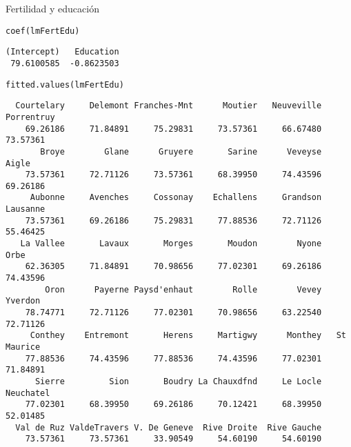 \documentclass[xcolor={usenames,svgnames,dvipsnames}]{beamer}
\begin{document}
\begin{frame}[fragile,label={sec:orga1748bf}]{Fertilidad y educación}
 \lstset{language=r,label= ,caption= ,captionpos=b,numbers=none}
\begin{lstlisting}
coef(lmFertEdu)
\end{lstlisting}

\begin{verbatim}
(Intercept)   Education 
 79.6100585  -0.8623503
\end{verbatim}

\lstset{language=r,label= ,caption= ,captionpos=b,numbers=none}
\begin{lstlisting}
fitted.values(lmFertEdu)
\end{lstlisting}

\begin{verbatim}
  Courtelary     Delemont Franches-Mnt      Moutier   Neuveville   Porrentruy 
    69.26186     71.84891     75.29831     73.57361     66.67480     73.57361 
       Broye        Glane      Gruyere       Sarine      Veveyse        Aigle 
    73.57361     72.71126     73.57361     68.39950     74.43596     69.26186 
     Aubonne     Avenches     Cossonay    Echallens     Grandson     Lausanne 
    73.57361     69.26186     75.29831     77.88536     72.71126     55.46425 
   La Vallee       Lavaux       Morges       Moudon        Nyone         Orbe 
    62.36305     71.84891     70.98656     77.02301     69.26186     74.43596 
        Oron      Payerne Paysd'enhaut        Rolle        Vevey      Yverdon 
    78.74771     72.71126     77.02301     70.98656     63.22540     72.71126 
     Conthey    Entremont       Herens     Martigwy      Monthey   St Maurice 
    77.88536     74.43596     77.88536     74.43596     77.02301     71.84891 
      Sierre         Sion       Boudry La Chauxdfnd     Le Locle    Neuchatel 
    77.02301     68.39950     69.26186     70.12421     68.39950     52.01485 
  Val de Ruz ValdeTravers V. De Geneve  Rive Droite  Rive Gauche 
    73.57361     73.57361     33.90549     54.60190     54.60190
\end{verbatim}
\end{frame}
\end{document}
